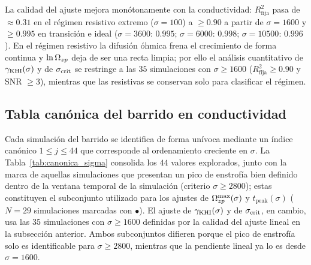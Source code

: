 \primerparrafo La calidad del ajuste mejora monótonamente con la conductividad: $R^2_{\mathrm{fija}}$ pasa de $\approx0.31$ en el régimen resistivo extremo ($\sigma=100$) a $\ge0.90$ a partir de $\sigma=1600$ y $\ge0.995$ en transición e ideal ($\sigma=3600$: $0.995$; $\sigma=6000$: $0.998$; $\sigma=10500$: $0.996$). En el régimen resistivo la difusión óhmica frena el crecimiento de forma continua y $\ln\Omega_{zp}$ deja de ser una recta limpia; por ello el análisis cuantitativo de $\gamma_{\mathrm{KHI}}(\sigma)$ y de $\sigma_{\mathrm{crit}}$ se restringe a las $35$ simulaciones con $\sigma\ge1600$ ($R^2_{\mathrm{fija}}\ge0.90$ y SNR $\ge3$), mientras que las resistivas se conservan solo para clasificar el régimen.

\subsection{Tabla canónica del barrido en conductividad}

\primerparrafo Cada simulación del barrido se identifica de forma unívoca mediante un índice canónico $1 \leq j \leq 44$ que corresponde al ordenamiento creciente en $\sigma$. La Tabla~\ref{tab:canonica_sigma} consolida los $44$ valores explorados, junto con la marca de aquellas simulaciones que presentan un pico de enstrofía bien definido dentro de la ventana temporal de la simulación (criterio $\sigma \geq 2800$); estas constituyen el subconjunto utilizado para los ajustes de $\Omega_{zp}^{\max}(\sigma)$ y $t_{\mathrm{peak}}(\sigma)$ ($N = 29$ simulaciones marcadas con $\bullet$). El ajuste de $\gamma_{\mathrm{KHI}}(\sigma)$ y de $\sigma_{\mathrm{crit}}$, en cambio, usa las $35$ simulaciones con $\sigma\ge1600$ definidas por la calidad del ajuste lineal en la subsección anterior. Ambos subconjuntos difieren porque el pico de enstrofía solo es identificable para $\sigma\ge2800$, mientras que la pendiente lineal ya lo es desde $\sigma=1600$.


